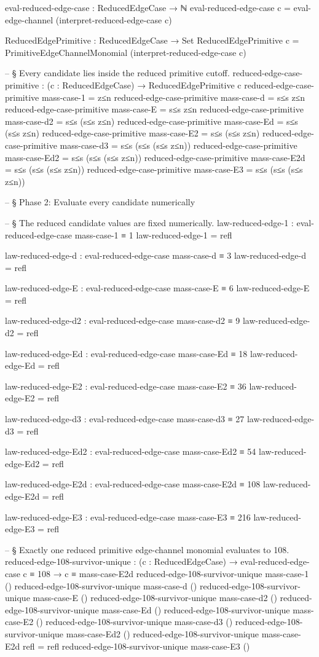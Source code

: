 \documentclass[11pt,a4paper]{book}
\begin{document}
\begin{code}
eval-reduced-edge-case : ReducedEdgeCase → ℕ
eval-reduced-edge-case c = eval-edge-channel (interpret-reduced-edge-case c)

ReducedEdgePrimitive : ReducedEdgeCase → Set
ReducedEdgePrimitive c =
  PrimitiveEdgeChannelMonomial (interpret-reduced-edge-case c)

-- § Every candidate lies inside the reduced primitive cutoff.
reduced-edge-case-primitive :
  (c : ReducedEdgeCase) →
  ReducedEdgePrimitive c
reduced-edge-case-primitive mass-case-1   = z≤n
reduced-edge-case-primitive mass-case-d   = s≤s z≤n
reduced-edge-case-primitive mass-case-E   = s≤s z≤n
reduced-edge-case-primitive mass-case-d2  = s≤s (s≤s z≤n)
reduced-edge-case-primitive mass-case-Ed  = s≤s (s≤s z≤n)
reduced-edge-case-primitive mass-case-E2  = s≤s (s≤s z≤n)
reduced-edge-case-primitive mass-case-d3  = s≤s (s≤s (s≤s z≤n))
reduced-edge-case-primitive mass-case-Ed2 = s≤s (s≤s (s≤s z≤n))
reduced-edge-case-primitive mass-case-E2d = s≤s (s≤s (s≤s z≤n))
reduced-edge-case-primitive mass-case-E3  = s≤s (s≤s (s≤s z≤n))

-- § Phase 2: Evaluate every candidate numerically

-- § The reduced candidate values are fixed numerically.
law-reduced-edge-1 : eval-reduced-edge-case mass-case-1 ≡ 1
law-reduced-edge-1 = refl

law-reduced-edge-d : eval-reduced-edge-case mass-case-d ≡ 3
law-reduced-edge-d = refl

law-reduced-edge-E : eval-reduced-edge-case mass-case-E ≡ 6
law-reduced-edge-E = refl

law-reduced-edge-d2 : eval-reduced-edge-case mass-case-d2 ≡ 9
law-reduced-edge-d2 = refl

law-reduced-edge-Ed : eval-reduced-edge-case mass-case-Ed ≡ 18
law-reduced-edge-Ed = refl

law-reduced-edge-E2 : eval-reduced-edge-case mass-case-E2 ≡ 36
law-reduced-edge-E2 = refl

law-reduced-edge-d3 : eval-reduced-edge-case mass-case-d3 ≡ 27
law-reduced-edge-d3 = refl

law-reduced-edge-Ed2 : eval-reduced-edge-case mass-case-Ed2 ≡ 54
law-reduced-edge-Ed2 = refl

law-reduced-edge-E2d : eval-reduced-edge-case mass-case-E2d ≡ 108
law-reduced-edge-E2d = refl

law-reduced-edge-E3 : eval-reduced-edge-case mass-case-E3 ≡ 216
law-reduced-edge-E3 = refl

-- § Exactly one reduced primitive edge-channel monomial evaluates to 108.
reduced-edge-108-survivor-unique :
  (c : ReducedEdgeCase) →
  eval-reduced-edge-case c ≡ 108 →
  c ≡ mass-case-E2d
reduced-edge-108-survivor-unique mass-case-1 ()
reduced-edge-108-survivor-unique mass-case-d ()
reduced-edge-108-survivor-unique mass-case-E ()
reduced-edge-108-survivor-unique mass-case-d2 ()
reduced-edge-108-survivor-unique mass-case-Ed ()
reduced-edge-108-survivor-unique mass-case-E2 ()
reduced-edge-108-survivor-unique mass-case-d3 ()
reduced-edge-108-survivor-unique mass-case-Ed2 ()
reduced-edge-108-survivor-unique mass-case-E2d refl = refl
reduced-edge-108-survivor-unique mass-case-E3 ()


\end{code}
\end{document}
